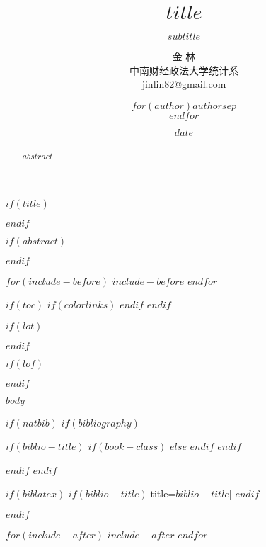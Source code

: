 \documentclass[UTF8,a4paper,12pt]{ctexart}  %
\author{\CJKfamily{kai} 金 \enspace 林 \\ \CJKfamily{kai} 中南财经政法大学统计系 \\ jinlin82@gmail.com}
\title{\LARGE\textbf{$title$}}
\title{}
\subtitle{$subtitle$}
\author{$for(author)$$author$$sep$ \\ $endfor$}
\author{}
\date{$date$}
\date{}
\renewcommand{\refname}{参考文献}            %
\begin{document}
$if(title)$
\maketitle
$endif$

$if(abstract)$
\begin{abstract}
$abstract$
\end{abstract}
$endif$

$for(include-before)$
$include-before$
$endfor$

$if(toc)$
{
$if(colorlinks)$
\hypersetup{linkcolor=$if(toccolor)$$toccolor$$else$black$endif$}
$endif$
\setcounter{tocdepth}{$toc-depth$}
\tableofcontents
}
$endif$

$if(lot)$
\listoftables
$endif$

$if(lof)$
\listoffigures
$endif$

$body$

$if(natbib)$
$if(bibliography)$

$if(biblio-title)$
$if(book-class)$
\renewcommand\bibname{$biblio-title$}
$else$
\renewcommand\refname{$biblio-title$}
$endif$
$endif$



$endif$
$endif$

$if(biblatex)$
\printbibliography$if(biblio-title)$[title=$biblio-title$]
$endif$

$endif$

$for(include-after)$
$include-after$
$endfor$
\end{document}
